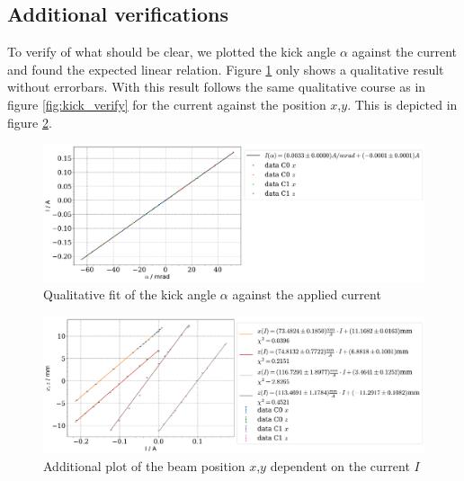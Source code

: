 \documentclass[11pt,a4paper,notitlepage]{scrartcl}
\begin{document}
\subsection{Additional verifications}\label{sec:additional_verficitation}
To verify of what should be clear, we plotted the kick angle $\alpha$ against the current and found the expected linear relation. Figure \ref{fig:qual_plot} only shows a qualitative result without errorbars. With this result follows the same qualitative course as in figure \ref{fig:kick_verify} for the current against the position $x$,$y$. This is depicted in figure \ref{fig:current_verify}.
\begin{figure}[H]
	\includegraphics[width=\linewidth]{figs/calibration/current_vs_kick.pdf}
	\caption{Qualitative fit of the kick angle $\alpha$ against the applied current}\label{fig:qual_plot}
\end{figure}
\begin{figure}[H]
	\includegraphics[width=\linewidth]{figs/calibration/current_verification.pdf}
	\caption{Additional plot of the beam position $x$,$y$ dependent on the current $I$}\label{fig:current_verify}
\end{figure}
\end{document}
